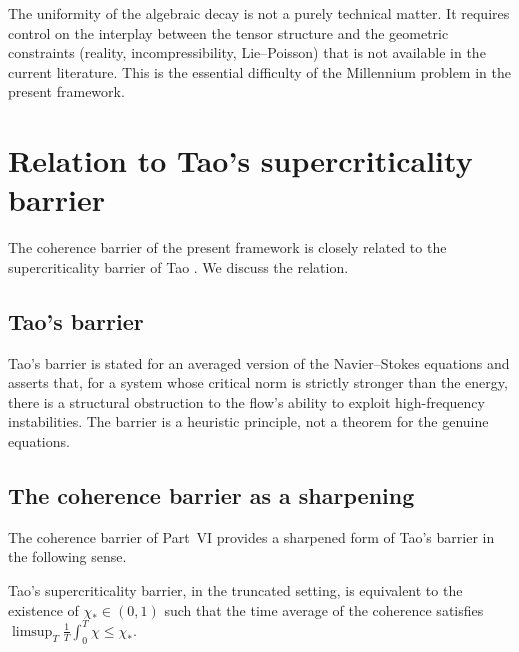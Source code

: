 \begin{remark}\label{part-6:rem:essential-diff}
The uniformity of the algebraic decay is not a purely technical 
matter. It requires control on the interplay between the tensor 
structure and the geometric constraints (reality, incompressibility, 
Lie--Poisson) that is not available in the current literature. This 
is the essential difficulty of the Millennium problem in the present 
framework.
\end{remark}

\section{Relation to Tao's supercriticality barrier}
\label{part-6:sec:Tao}

The coherence barrier of the present framework is closely related to 
the supercriticality barrier of Tao \cite{Tao2016}. We discuss the 
relation.

\subsection{Tao's barrier}
\label{part-6:ssec:Tao-barrier}

Tao's barrier is stated for an averaged version of the 
Navier--Stokes equations and asserts that, for a system whose 
critical norm is strictly stronger than the energy, there is a 
structural obstruction to the flow's ability to exploit 
high-frequency instabilities. The barrier is a heuristic principle, 
not a theorem for the genuine equations.

\subsection{The coherence barrier as a sharpening}
\label{part-6:ssec:coherence-sharpening}

The coherence barrier of Part~VI provides a sharpened form of Tao's 
barrier in the following sense.

\begin{proposition}\label{part-6:prop:sharpening}
Tao's supercriticality barrier, in the truncated setting, is 
equivalent to the existence of $\chi_\ast\in(0,1)$ such that 
the time average of the coherence satisfies 
$\limsup_T\frac{1}{T}\int_0^T\chi\leq\chi_\ast$.
\end{proposition}

